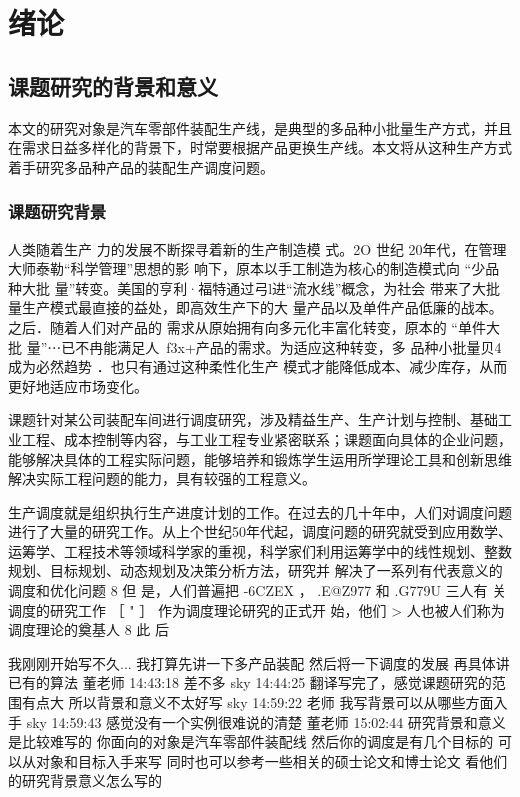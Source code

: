 \chapter{绪论}
\section{课题研究的背景和意义}
本文的研究对象是汽车零部件装配生产线，是典型的多品种小批量生产方式，并且在需求日益多样化的背景下，时常要根据产品更换生产线。本文将从这种生产方式着手研究多品种产品的装配生产调度问题。

\subsection{课题研究背景}
人类随着生产 力的发展不断探寻着新的生产制造模
式。2O 世纪 20年代，在管理大师泰勒“科学管理”思想的影
响下，原本以手工制造为核心的制造模式向 “少品种大批
量”转变。美国的亨利·福特通过弓l进“流水线”概念，为社会
带来了大批量生产模式最直接的益处，即高效生产下的大
量产品以及单件产品低廉的战本。之后．随着人们对产品的
需求从原始拥有向多元化丰富化转变，原本的 “单件大批
量”⋯已不冉能满足人~f3x+产品的需求。为适应这种转变，多
品种小批量贝4成为必然趋势 ．也只有通过这种柔性化生产
模式才能降低成本、减少库存，从而更好地适应市场变化。

课题针对某公司装配车间进行调度研究，涉及精益生产、生产计划与控制、基础工业工程、成本控制等内容，与工业工程专业紧密联系；课题面向具体的企业问题，能够解决具体的工程实际问题，能够培养和锻炼学生运用所学理论工具和创新思维解决实际工程问题的能力，具有较强的工程意义。

生产调度就是组织执行生产进度计划的工作。在过去的几十年中，人们对调度问题进行了大量的研究工作。从上个世纪50年代起，调度问题的研究就受到应用数学、运筹学、工程技术等领域科学家的重视，科学家们利用运筹学中的线性规划、整数规划、目标规划、动态规划及决策分析方法，研究并
解决了一系列有代表意义的调度和优化问题 8 但
是，人们普遍把 -6CZEX ，
.E@Z977 和 .G779U 三人有
关调度的研究工作
［ " ］ 作为调度理论研究的正式开
始，他们 > 人也被人们称为调度理论的奠基人 8 此\cite{徐俊刚2004生产调度理论和方法研究综述}
后\cite{1998distributed}

我刚刚开始写不久...
我打算先讲一下多产品装配 然后将一下调度的发展 再具体讲已有的算法
董老师 14:43:18 
差不多
sky 14:44:25 
翻译写完了，感觉课题研究的范围有点大 所以背景和意义不太好写
sky 14:59:22 
老师 我写背景可以从哪些方面入手
sky 14:59:43 
感觉没有一个实例很难说的清楚
董老师 15:02:44 
研究背景和意义是比较难写的
你面向的对象是汽车零部件装配线  然后你的调度是有几个目标的 可以从对象和目标入手来写
同时也可以参考一些相关的硕士论文和博士论文 看他们的研究背景意义怎么写的

